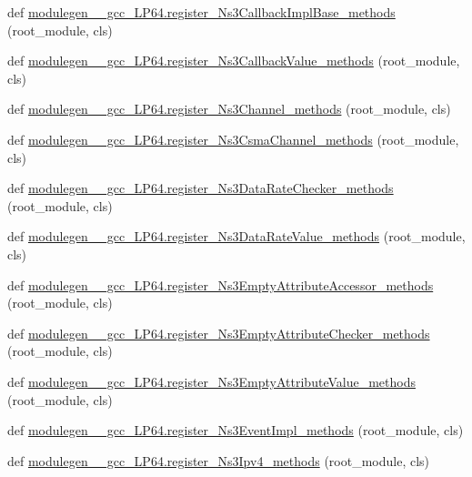 \begin{DoxyCompactItemize}
\item 
def \hyperlink{namespacemodulegen____gcc__LP64_a27471f48136ec47282f70d414c0f7b6a}{modulegen\+\_\+\+\_\+gcc\+\_\+\+L\+P64.\+register\+\_\+\+Ns3\+Callback\+Impl\+Base\+\_\+methods} (root\+\_\+module, cls)
\item 
def \hyperlink{namespacemodulegen____gcc__LP64_a08b703ec5906729a642f77b58b43c8d8}{modulegen\+\_\+\+\_\+gcc\+\_\+\+L\+P64.\+register\+\_\+\+Ns3\+Callback\+Value\+\_\+methods} (root\+\_\+module, cls)
\item 
def \hyperlink{namespacemodulegen____gcc__LP64_a8152d8ba5a6f1d5b869cf79767d9633e}{modulegen\+\_\+\+\_\+gcc\+\_\+\+L\+P64.\+register\+\_\+\+Ns3\+Channel\+\_\+methods} (root\+\_\+module, cls)
\item 
def \hyperlink{namespacemodulegen____gcc__LP64_a931182772500ad32039d3978e60fc360}{modulegen\+\_\+\+\_\+gcc\+\_\+\+L\+P64.\+register\+\_\+\+Ns3\+Csma\+Channel\+\_\+methods} (root\+\_\+module, cls)
\item 
def \hyperlink{namespacemodulegen____gcc__LP64_ab2f42b6063e5e94cdc2dc949e695869f}{modulegen\+\_\+\+\_\+gcc\+\_\+\+L\+P64.\+register\+\_\+\+Ns3\+Data\+Rate\+Checker\+\_\+methods} (root\+\_\+module, cls)
\item 
def \hyperlink{namespacemodulegen____gcc__LP64_a5a6db47983f455cd703998c947346f9a}{modulegen\+\_\+\+\_\+gcc\+\_\+\+L\+P64.\+register\+\_\+\+Ns3\+Data\+Rate\+Value\+\_\+methods} (root\+\_\+module, cls)
\item 
def \hyperlink{namespacemodulegen____gcc__LP64_a5885028edb9b0cbbdf4f75d1388d6b19}{modulegen\+\_\+\+\_\+gcc\+\_\+\+L\+P64.\+register\+\_\+\+Ns3\+Empty\+Attribute\+Accessor\+\_\+methods} (root\+\_\+module, cls)
\item 
def \hyperlink{namespacemodulegen____gcc__LP64_aa52eca018e0116d17b4c6c2798dcee71}{modulegen\+\_\+\+\_\+gcc\+\_\+\+L\+P64.\+register\+\_\+\+Ns3\+Empty\+Attribute\+Checker\+\_\+methods} (root\+\_\+module, cls)
\item 
def \hyperlink{namespacemodulegen____gcc__LP64_a86864e6a4eb56d909f7b4550592ead3b}{modulegen\+\_\+\+\_\+gcc\+\_\+\+L\+P64.\+register\+\_\+\+Ns3\+Empty\+Attribute\+Value\+\_\+methods} (root\+\_\+module, cls)
\item 
def \hyperlink{namespacemodulegen____gcc__LP64_af4f20b1c5907e07b645fc3d57c733d1a}{modulegen\+\_\+\+\_\+gcc\+\_\+\+L\+P64.\+register\+\_\+\+Ns3\+Event\+Impl\+\_\+methods} (root\+\_\+module, cls)
\item 
def \hyperlink{namespacemodulegen____gcc__LP64_ac5ae8854d3ed4fdcb8af65998f502033}{modulegen\+\_\+\+\_\+gcc\+\_\+\+L\+P64.\+register\+\_\+\+Ns3\+Ipv4\+\_\+methods} (root\+\_\+module, cls)

\end{DoxyCompactItemize}
